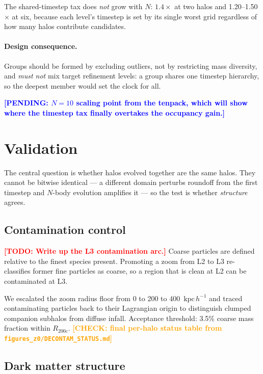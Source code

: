 \documentclass[twocolumn,linenumbers]{aastex631}
\newcommand{\todo}[1]{\textcolor{red}{\textbf{[TODO: #1]}}}
\newcommand{\pending}[1]{\textcolor{blue}{\textbf{[PENDING: #1]}}}
\newcommand{\check}[1]{\textcolor{orange}{\textbf{[CHECK: #1]}}}
\newcommand{\measured}[1]{#1}
\newcommand{\Rvir}{\ensuremath{R_{200\mathrm{c}}}}
\newcommand{\kpch}{\ensuremath{\mathrm{kpc}\,h^{-1}}}
\begin{document}
The shared-timestep tax does \emph{not} grow with $N$:
\measured{$1.4\times$} at two halos and \measured{1.20--1.50$\times$} at six,
because each level's timestep is set by its single worst grid regardless of
how many halos contribute candidates.

\paragraph{Design consequence.} Groups should be formed by excluding
outliers, not by restricting mass diversity, and \emph{must not} mix target
refinement levels: a group shares one timestep hierarchy, so the deepest
member would set the clock for all.

\pending{$N=10$ scaling point from the tenpack, which will show where the
timestep tax finally overtakes the occupancy gain.}

\section{Validation}
\label{sec:validation}

The central question is whether halos evolved together are the same halos.
They cannot be bitwise identical --- a different domain perturbs roundoff from
the first timestep and $N$-body evolution amplifies it --- so the test is
whether \emph{structure} agrees.

\subsection{Contamination control}
\label{sec:contamination}

\todo{Write up the L3 contamination arc.} Coarse particles are defined
relative to the finest species present. Promoting a zoom from L2 to L3
re-classifies former fine particles as coarse, so a region that is clean at
L2 can be contaminated at L3.

We escalated the zoom radius floor from 0 to 200 to
\measured{400}~\kpch{} and traced contaminating particles back to their
Lagrangian origin to distinguish clumped companion subhalos from diffuse
infall. Acceptance threshold: \measured{3.5\%} coarse mass fraction within
\Rvir{}. \check{final per-halo status table from
\texttt{figures\_z0/DECONTAM\_STATUS.md}}

\subsection{Dark matter structure}
\label{sec:dm-audit}
\end{document}

